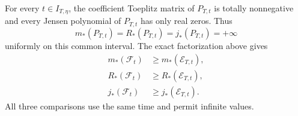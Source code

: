 \begin{corollary}
\label{cor:fd-density-detection}
For every \(t\in I_{T,\eta}\), the coefficient Toeplitz matrix of
\(P_{T,t}\) is totally nonnegative and every Jensen polynomial of
\(P_{T,t}\) has only real zeros. Thus
\[
 m_*(P_{T,t})=R_*(P_{T,t})=j_*(P_{T,t})=+\infty
\]
uniformly on this common interval. The exact factorization above gives
\[
 \begin{split}
 m_*(\mathcal F_t)&\ge m_*(\mathcal E_{T,t}),\\
 R_*(\mathcal F_t)&\ge R_*(\mathcal E_{T,t}),\\
 j_*(\mathcal F_t)&\ge j_*(\mathcal E_{T,t}).
 \end{split}
\]
All three comparisons use the same time and permit infinite values.
\end{corollary}
